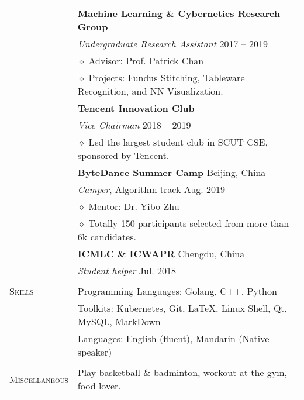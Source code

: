 \documentclass[letterpaper, 11pt]{article}
\begin{document}
\begin{longtable}{p{1in}p{5in}}
& \textbf{Machine Learning \& Cybernetics Research Group} \\
& \textit{Undergraduate Research Assistant} \hfill 2017 -- 2019 \\
& $\diamond$ Advisor: Prof. Patrick Chan \\
& $\diamond$ Projects: Fundus Stitching, Tableware Recognition, and NN Visualization. \\

& \textbf{Tencent Innovation Club} \\
& \textit{Vice Chairman} \hfill 2018 -- 2019 \\
& $\diamond$ Led the largest student club in SCUT CSE, sponsored by Tencent. \\

& \textbf{ByteDance Summer Camp} \hfill Beijing, China \\
& \textit{Camper}, Algorithm track \hfill Aug. 2019 \\
& $\diamond$ Mentor: Dr. Yibo Zhu \\
& $\diamond$ Totally 150 participants selected from more than 6k candidates. \\

& \textbf{ICMLC \& ICWAPR} \hfill Chengdu, China \\
& \textit{Student helper} \hfill Jul. 2018 \\

& \\

\nohyphens{\textsc{Skills}}
& Programming Languages: Golang, C++, Python  \\
& Toolkits: Kubernetes, Git, \LaTeX, Linux Shell, Qt, MySQL, MarkDown \\
& Languages: English (fluent), Mandarin (Native speaker) \\
& \\


\nohyphens{\textsc{Miscellaneous}}
& Play basketball \& badminton, workout at the gym, food lover. \\


\end{longtable}
\end{document}
